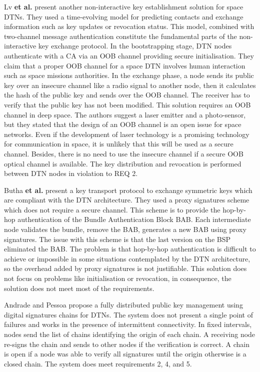 Lv \textbf{et al.} \cite{lv2014non} present another non-interactive key establishment solution for space DTNs. They used a time-evolving model for predicting contacts and exchange information such as key updates or revocation status. This model, combined with two-channel message authentication constitute the fundamental parts of the non-interactive key exchange protocol. In the bootstrapping stage, DTN nodes authenticate with a CA via an OOB channel providing secure initialisation. They claim that a proper OOB channel for a space DTN involves human interaction such as space missions authorities. In the exchange phase, a node sends its public key over an insecure channel like a radio signal to another node, then it calculates the hash of the public key and sends over the OOB channel. The receiver has to verify that the public key has not been modified. This solution requires an OOB channel in deep space. The authors suggest a laser emitter and a photo-sensor, but they stated that the design of an OOB channel is an open issue for space networks. Even if the development of laser technology is a promising technology for communication in space, it is unlikely that this will be used as a secure channel. Besides, there is no need to use the insecure channel if a secure OOB optical channel is available.  The key distribution and revocation is performed between DTN nodes in violation to REQ 2.  

Butha \textbf{et al.} \cite{bhutta2014efficient} present a key transport protocol to exchange symmetric keys which are compliant with the DTN architecture. They used a proxy signatures scheme which does not require a secure channel. This scheme is to provide the hop-by-hop authentication of the Bundle Authentication Block BAB. Each intermediate node validates the bundle, remove the BAB,  generates a new BAB using proxy signatures. The issue with this scheme is that the last version on the BSP eliminated the BAB.  The problem is that hop-by-hop authentication is difficult to achieve or impossible in some situations contemplated by the DTN architecture, so the overhead added by proxy signatures is not justifiable. This solution does not focus on problems like initialisation or revocation, in consequence, the solution does not meet most of the requirements.

Andrade and Pessoa \cite{de2016fully} propose a fully distributed public key management using digital signatures chains for DTNs. The system does not present a single point of failures and works in the presence of intermittent connectivity. In fixed intervals, nodes send the list of chains identifying the origin of each chain. A receiving node re-signs the chain and sends to other nodes if the verification is correct. A chain is open if a node was able to verify all signatures until the origin otherwise is a closed chain. The system does meet requirements 2, 4, and 5.


